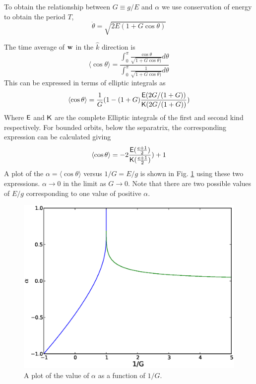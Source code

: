 \documentclass[11pt]{ucthesis}
\def\bw{{\bf w}}
\begin{document}
To obtain the relationship between $G \equiv g/E$ and $\alpha$ we use conservation of energy
to obtain the period $T$,
\begin{equation}
\label{eq:pendulumenergy}
\dot{\theta} = \sqrt{2E(1+G\cos\theta)}
\end{equation}

The time average of $\bw$ in the $\hat k$ direction is
\begin{equation}
\label{eq:avependulumcostheta}
\langle \cos\theta\rangle = \frac{\int_0^\pi \frac{\cos\theta}{\sqrt{1+G\cos\theta)}} d\theta}{\int_0^\pi \frac{1}{\sqrt{1+G\cos\theta)}} d\theta}
\end{equation}
This can be expressed in terms of elliptic integrals as
\begin{equation}
\label{eq:avecosthetaElliptic}
\langle \cos\theta\rangle =  \frac{1}{G} (1- (1+G) \frac{{\sf E}(2G/(1+G))}{{\sf K}(2G/(1+G))})
\end{equation}
Where  $\sf E$ and $\sf K$ are the complete Elliptic integrals of the first and second kind respectively.
For bounded orbits, below the separatrix, the corresponding expression can be calculated giving
\begin{equation}
\label{eq:avecosthetaEllipticBounded}
\langle \cos\theta\rangle =  -2 \frac{{\sf E}(\frac{e+1}{2})}{{\sf K} (\frac{e+1}{2}) }) + 1
\end{equation}
A plot of the $\alpha = \langle \cos\theta\rangle$ versus $1/G = E/g$ is shown in Fig. \ref{fig:AlphaVsE}
using these two expressions.
$\alpha \rightarrow 0$ in the limit as $G \rightarrow 0$. Note that there are two possible values of
$E/g$ corresponding to one value of positive $\alpha$.

\begin{figure}[htp]
\begin{center}
\includegraphics[width=\hsize]{alpha_vs_E.eps}
\caption{ 
A plot of the value of $\alpha$ as a function of $1/G$.
}
\label{fig:AlphaVsE}
\end{center}
\end{figure}
\end{document}
